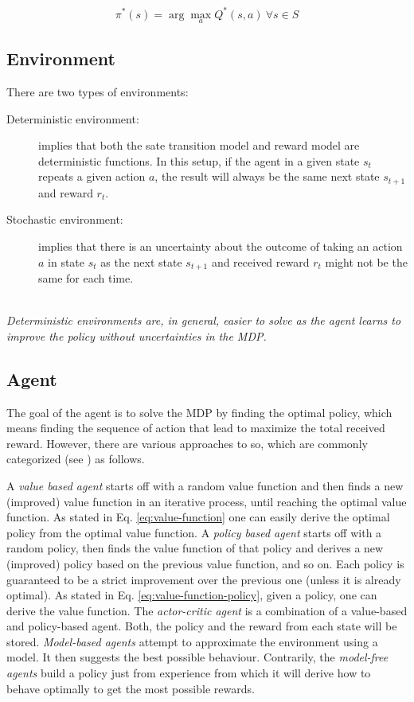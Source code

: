\begin{equation}\label{eq:optimal-policy-s}
\pi^*(s)=\arg \max_{a} Q^*(s, a)\ \forall{s}\in{S}
\end{equation}

\subsection{Environment}
\label{sec:rl-environment}

There are two types of environments:
\begin{description}
    \item[Deterministic environment:] implies that both the sate transition model and reward model are deterministic functions. 
    In this setup, if the agent in a given state $s_t$ repeats a given action $a$, the result will always be the same next state $s_{t+1}$ and reward $r_t$.

    \item[Stochastic environment:] implies that there is an uncertainty about the outcome of taking an action $a$ in state $s_t$ as the next state $s_{t+1}$ and received reward $r_t$ might not be the same for each time.
\end{description}
\hfill
\\
\textit{Deterministic environments are, in general, easier to solve as the agent learns to improve the policy without uncertainties in the MDP. }

\subsection{Agent}
\label{sec:rl-agent}

The goal of the agent is to solve the MDP by finding the optimal policy, which means finding the sequence of action that lead to maximize the total received reward.
However, there are various approaches to so, which are commonly categorized (see \cite{rl-demysitifed2}) as follows.

A \textit{value based agent} starts off with a random value function and then finds a new (improved) value function in an iterative process, until reaching the optimal value function. 
As stated in Eq. \ref{eq:value-function} one can easily derive the optimal policy from the optimal value function. 
A \textit{policy based agent} starts off with a random policy, then finds the value function of that policy and derives a new (improved) policy based on the previous value function, and so on. Each policy is guaranteed to be a strict improvement over the previous one (unless it is already optimal). As stated in Eq. \ref{eq:value-function-policy}, given a policy, one can derive the value function.
The \textit{actor-critic agent} is a combination of a value-based and policy-based agent. Both, the policy and the reward from each state will be stored.
\textit{Model-based agents} attempt to approximate the environment using a model. It then suggests the best possible behaviour.
Contrarily, the \textit{model-free agents} build a policy just from experience from which it will derive how to behave optimally to get the most possible rewards.

